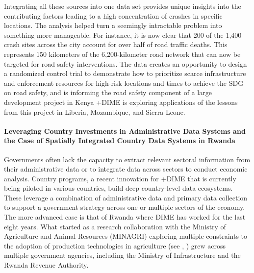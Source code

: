 \documentclass[
]{WileySix}
\begin{document}
Integrating all these sources into one data set provides unique insights into the contributing factors leading to a high concentration of crashes in specific locations. The analysis helped turn a seemingly intractable problem into something more manageable. For instance, it is now clear that 200 of the 1,400 crash sites across the city account for over half of road traffic deaths. This represents 150 kilometers of the 6,200-kilometer road network that can now be targeted for road safety interventions. The data creates an opportunity to design a randomized control trial to demonstrate how to prioritize scarce infrastructure and enforcement resources for high-risk locations and times to achieve the SDG on road safety, and is informing the road safety component of a large development project in Kenya +DIME\textbar{} is exploring applications of the lessons from this project in Liberia, Mozambique, and Sierra Leone.

\hypertarget{leveraging-country-investments-in-administrative-data-systems-and-the-case-of-spatially-integrated-country-data-systems-in-rwanda}{%
\paragraph{Leveraging Country Investments in Administrative Data Systems and the Case of Spatially Integrated Country Data Systems in Rwanda}\label{leveraging-country-investments-in-administrative-data-systems-and-the-case-of-spatially-integrated-country-data-systems-in-rwanda}}

Governments often lack the capacity to extract relevant sectoral information from their administrative data or to integrate data across sectors to conduct economic analysis. Country programs, a recent innovation for +DIME\textbar{} that is currently being piloted in various countries, build deep country-level data ecosystems. These leverage a combination of administrative data and primary data collection to support a government strategy across one or multiple sectors of the economy. The more advanced case is that of Rwanda where DIME has worked for the last eight years. What started as a research collaboration with the Ministry of Agriculture and Animal Resources (MINAGRI) exploring multiple constraints to the adoption of production technologies in agriculture (see \citet{jones2018}, \citet{jones2019}) grew across multiple government agencies, including the Ministry of Infrastructure and the Rwanda Revenue Authority.
\end{document}

